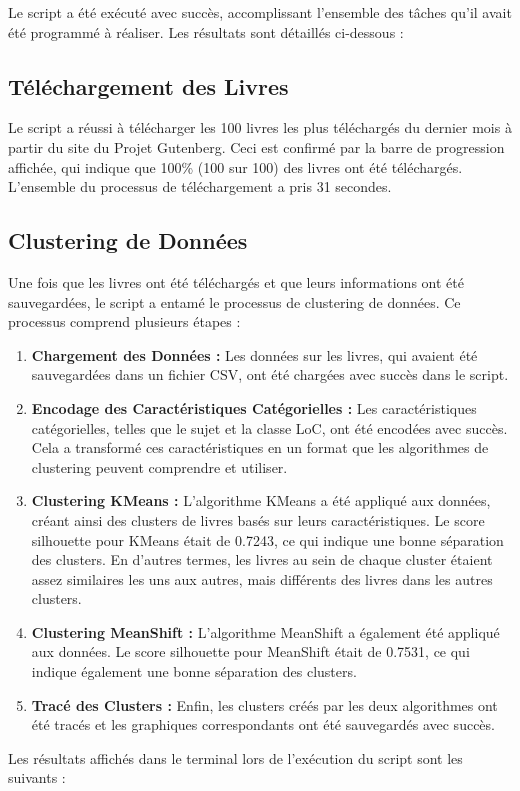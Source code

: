 Le script a été exécuté avec succès, accomplissant l'ensemble des tâches qu'il avait été programmé à réaliser. Les résultats sont détaillés ci-dessous :

\subsection{Téléchargement des Livres}
Le script a réussi à télécharger les 100 livres les plus téléchargés du dernier mois à partir du site du Projet Gutenberg. Ceci est confirmé par la barre de progression affichée, qui indique que 100\% (100 sur 100) des livres ont été téléchargés. L'ensemble du processus de téléchargement a pris 31 secondes.

\subsection{Clustering de Données}
Une fois que les livres ont été téléchargés et que leurs informations ont été sauvegardées, le script a entamé le processus de clustering de données. Ce processus comprend plusieurs étapes :
\begin{enumerate}
    \item \textbf{Chargement des Données :} Les données sur les livres, qui avaient été sauvegardées dans un fichier CSV, ont été chargées avec succès dans le script.
    \item \textbf{Encodage des Caractéristiques Catégorielles :} Les caractéristiques catégorielles, telles que le sujet et la classe LoC, ont été encodées avec succès. Cela a transformé ces caractéristiques en un format que les algorithmes de clustering peuvent comprendre et utiliser.
    \item \textbf{Clustering KMeans :} L'algorithme KMeans a été appliqué aux données, créant ainsi des clusters de livres basés sur leurs caractéristiques. Le score silhouette pour KMeans était de 0.7243, ce qui indique une bonne séparation des clusters. En d'autres termes, les livres au sein de chaque cluster étaient assez similaires les uns aux autres, mais différents des livres dans les autres clusters.
    \item \textbf{Clustering MeanShift :} L'algorithme MeanShift a également été appliqué aux données. Le score silhouette pour MeanShift était de 0.7531, ce qui indique également une bonne séparation des clusters.
    \item \textbf{Tracé des Clusters :} Enfin, les clusters créés par les deux algorithmes ont été tracés et les graphiques correspondants ont été sauvegardés avec succès.
\end{enumerate}
\newpage
Les résultats affichés dans le terminal lors de l'exécution du script sont les suivants :

